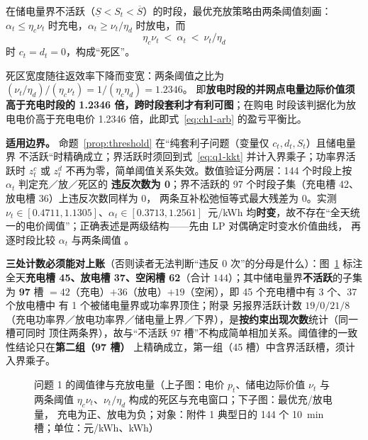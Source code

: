 \begin{proposition}[阈值律]\label{prop:threshold}
在储电量界不活跃（\(\underline S<S_t<\overline S\)）的时段，最优充放策略由两条阈值刻画：
\(\alpha_t\le\eta_c\nu_t\) 时充电，\(\alpha_t\ge\nu_t/\eta_d\) 时放电，而
\begin{equation}
  \eta_c\nu_t\ <\ \alpha_t\ <\ \nu_t/\eta_d
  \label{eq:q1-deadband}
\end{equation}
时 \(c_t=d_t=0\)，构成“死区”。
\end{proposition}

死区宽度随往返效率下降而变宽：两条阈值之比为 \((\nu_t/\eta_d)/(\eta_c\nu_t)=1/(\eta_c\eta_d)=1.2346\)。
即\textbf{放电时段的并网点电量边际价值须高于充电时段的 1.2346 倍，跨时段套利才有利可图}；在购电
时段该判据化为放电电价高于充电电价 1.2346 倍，此即式~\eqref{eq:ch1-arb} 的盈亏平衡比。

\textbf{适用边界。} 命题~\ref{prop:threshold} 在“纯套利子问题（变量仅 \(c_t,d_t,S_t\)）且储电量界
不活跃“时精确成立；界活跃时须回到式~\eqref{eq:q1-kkt} 并计入界乘子；功率界活跃时 \(z^c_t\) 或
\(z^d_t\) 不再为零，简单阈值关系失效。数值验证分两层：144 个时段上按 \(\alpha_t\) 判定充／放／死区的
\textbf{违反次数为 0}；界不活跃的 97 个时段子集（充电槽 42、放电槽 36）上违反次数同样为 0，
两条互补松弛恒等式最大残差为 0。实测 \(\nu_t\in[0.4711,1.1305]\)、\(\alpha_t\in[0.3713,1.2561]\)~元/kWh
均\textbf{时变}，故不存在“全天统一的电价阈值”；正确表述是两级结构——先由 LP 对偶确定时变水价值曲线，
再逐时段比较 \(\alpha_t\) 与两条阈值 。

\textbf{三处计数必须能对上账}（否则读者无法判断“违反 0 次”的分母是什么）：图~\ref{fig:dualprice} 标注
全天\textbf{充电槽 45、放电槽 37、空闲槽 62}（合计 \(144\)）；其中储电量界\textbf{不活跃}的子集为
\textbf{97} 槽 \(=42\)（充电）\(+36\)（放电）\(+19\)（空闲），即 45 个充电槽中有 3 个、37 个放电槽中
有 1 个被储电量界或功率界顶住；附录 另报界活跃计数
\(19/0/21/8\)（充电功率界／放电功率界／储电量上界／下界），是\textbf{按约束出现次数}统计（同一槽可同时
顶住两条界），故与“不活跃 97 槽”不构成简单相加关系。阈值律的一致性结论只在\textbf{第二组（97 槽）}
上精确成立，第一组（45 槽）中含界活跃槽，须计入界乘子。

\begin{figure}[htbp]
  \centering
  \caption{问题 1 的阈值律与充放电量（上子图：电价 \(p_t\)、储电边际价值 \(\nu_t\) 与两条阈值
            \(\eta_c\nu_t\)、\(\nu_t/\eta_d\) 构成的死区与充电窗口；下子图：最优充/放电量，
            充电为正、放电为负；对象：附件 1 典型日的 144 个 10~min 槽；单位：元/kWh、kWh）}
  \label{fig:dualprice}
\end{figure}

